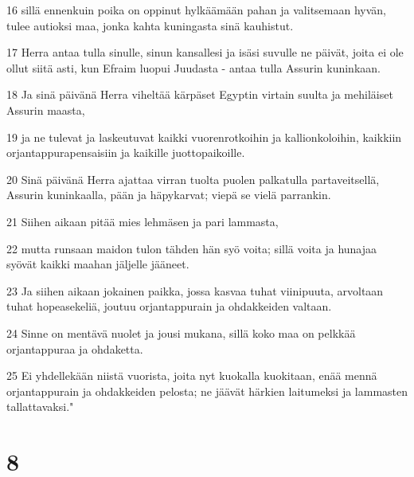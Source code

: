 \par 16 sillä ennenkuin poika on oppinut hylkäämään pahan ja valitsemaan hyvän, tulee autioksi maa, jonka kahta kuningasta sinä kauhistut.
\par 17 Herra antaa tulla sinulle, sinun kansallesi ja isäsi suvulle ne päivät, joita ei ole ollut siitä asti, kun Efraim luopui Juudasta - antaa tulla Assurin kuninkaan.
\par 18 Ja sinä päivänä Herra viheltää kärpäset Egyptin virtain suulta ja mehiläiset Assurin maasta,
\par 19 ja ne tulevat ja laskeutuvat kaikki vuorenrotkoihin ja kallionkoloihin, kaikkiin orjantappurapensaisiin ja kaikille juottopaikoille.
\par 20 Sinä päivänä Herra ajattaa virran tuolta puolen palkatulla partaveitsellä, Assurin kuninkaalla, pään ja häpykarvat; viepä se vielä parrankin.
\par 21 Siihen aikaan pitää mies lehmäsen ja pari lammasta,
\par 22 mutta runsaan maidon tulon tähden hän syö voita; sillä voita ja hunajaa syövät kaikki maahan jäljelle jääneet.
\par 23 Ja siihen aikaan jokainen paikka, jossa kasvaa tuhat viinipuuta, arvoltaan tuhat hopeasekeliä, joutuu orjantappurain ja ohdakkeiden valtaan.
\par 24 Sinne on mentävä nuolet ja jousi mukana, sillä koko maa on pelkkää orjantappuraa ja ohdaketta.
\par 25 Ei yhdellekään niistä vuorista, joita nyt kuokalla kuokitaan, enää mennä orjantappurain ja ohdakkeiden pelosta; ne jäävät härkien laitumeksi ja lammasten tallattavaksi."

\chapter{8}

